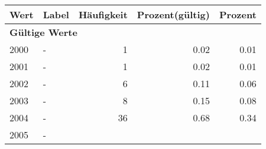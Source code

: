      \begin{longtable}{lXrrr}
     \toprule
     \textbf{Wert} & \textbf{Label} & \textbf{Häufigkeit} & \textbf{Prozent(gültig)} & \textbf{Prozent} \\
     \endhead
     \midrule
     \multicolumn{5}{l}{\textbf{Gültige Werte}}\\

     2000 &
     \multicolumn{1}{X}{ -  } &


       \num{1} &
       \num[round-mode=places,round-precision=2]{0,02} &
         \num[round-mode=places,round-precision=2]{0,01} \\

     2001 &
     \multicolumn{1}{X}{ -  } &


       \num{1} &
       \num[round-mode=places,round-precision=2]{0,02} &
         \num[round-mode=places,round-precision=2]{0,01} \\

     2002 &
     \multicolumn{1}{X}{ -  } &


       \num{6} &
       \num[round-mode=places,round-precision=2]{0,11} &
         \num[round-mode=places,round-precision=2]{0,06} \\

     2003 &
     \multicolumn{1}{X}{ -  } &


       \num{8} &
       \num[round-mode=places,round-precision=2]{0,15} &
         \num[round-mode=places,round-precision=2]{0,08} \\

     2004 &
     \multicolumn{1}{X}{ -  } &


       \num{36} &
       \num[round-mode=places,round-precision=2]{0,68} &
         \num[round-mode=places,round-precision=2]{0,34} \\

     2005 &
     \multicolumn{1}{X}{ -  } &



\end{longtable}
